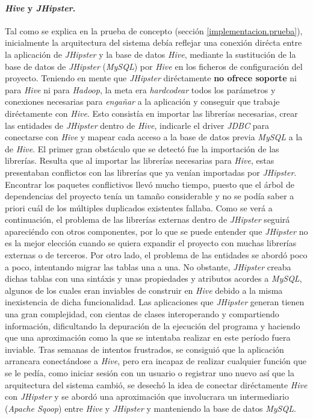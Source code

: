 \paragraph*{\textit{Hive} y \textit{JHipster}.} Tal como se explica en la prueba de concepto (sección \ref{implementacion.prueba}), inicialmente la arquitectura del sistema debía reflejar una conexión dirécta entre la aplicación de \textit{JHipster} y la base de datos \textit{Hive}, mediante la sustitución de la base de datos de \textit{JHipster} (\textit{MySQL}) por \textit{Hive} en los ficheros de configuración del proyecto. Teniendo en mente que \textit{JHipster} diréctamente \textbf{no ofrece soporte} ni para \textit{Hive} ni para \textit{Hadoop}, la meta era \textit{hardcodear} todos los parámetros y conexiones necesarias para \textit{engañar} a la aplicación y conseguir que trabaje diréctamente con \textit{Hive}. Esto consistía en importar las librerías necesarias, crear las entidades de \textit{JHipster} dentro de \textit{Hive}, indicarle el driver \textit{JDBC} para conectarse con \textit{Hive} y mapear cada acceso a la base de datos previa \textit{MySQL} a la de \textit{Hive}. El primer gran obstáculo que se detectó fue la importación de las librerías. Resulta que al importar las librerías necesarias para \textit{Hive}, estas presentaban conflictos con las librerías que ya venían importadas por \textit{JHipster}. Encontrar los paquetes conflictivos llevó mucho tiempo, puesto que el árbol de dependencias del proyecto tenía un tamaño considerable y no se podía saber a priori cuál de los múltiples duplicados existentes fallaba. Como se verá a continuación, el problema de las librerías externas dentro de \textit{JHipster} seguirá apareciéndo con otros componentes, por lo que se puede entender que \textit{JHipster} no es la mejor elección cuando se quiera expandir el proyecto con muchas librerías externas o de terceros. Por otro lado, el problema de las entidades se abordó poco a poco, intentando migrar las tablas una a una. No obstante, \textit{JHipster} creaba dichas tablas con una sintáxis y unas propiedades y atributos acordes a \textit{MySQL}, algunos de los cuales eran inviables de construir en \textit{Hive} debido a la misma inexistencia de dicha funcionalidad. Las aplicaciones que \textit{JHipster} generan tienen una gran complejidad, con cientas de clases interoperando y compartiendo información, dificultando la depuración de la ejecución del programa y haciendo que una aproximación como la que se intentaba realizar en este período fuera inviable. Tras semanas de intentos frustrados, se consiguió que la  aplicación arrancara conectándose a \textit{Hive}, pero era incapaz de realizar cualquier función que se le pedía, como iniciar sesión con un usuario o registrar uno nuevo así que la arquitectura del sistema cambió, se desechó la idea de conectar diréctamente \textit{Hive} con \textit{JHipster} y se abordó una aproximación que involucrara un intermediario (\textit{Apache Sqoop}) entre \textit{Hive} y \textit{JHipster} y manteniendo la base de datos \textit{MySQL}.

